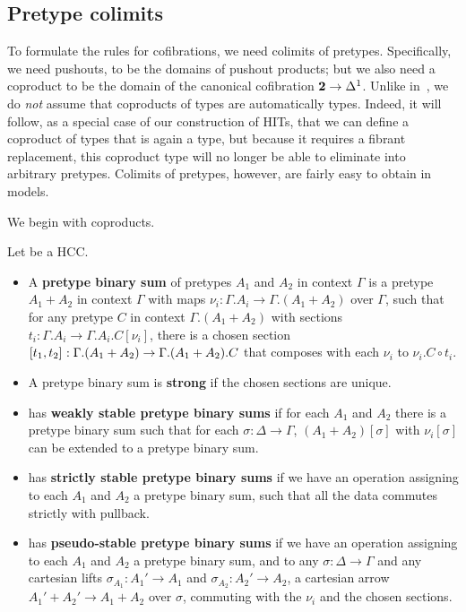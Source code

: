 \documentclass{amsart}
\begin{document}
\subsection{Pretype colimits}
\label{sec:pretype-colimits}

To formulate the rules for cofibrations, we need colimits of pretypes.
Specifically, we need pushouts, to be the domains of pushout products; but we also need a coproduct to be the domain of the canonical cofibration $\mathbf{2}\to {\Delta^1}$.
Unlike in~\cite{vv:hts}, we do \emph{not} assume that coproducts of types are automatically types.
Indeed, it will follow, as a special case of our construction of HITs, that we can define a coproduct of types that is again a type, but because it requires a fibrant replacement, this coproduct type will no longer be able to eliminate into arbitrary pretypes.
Colimits of pretypes, however, are fairly easy to obtain in models.

We begin with coproducts.

\begin{defn}
  Let \E be a HCC.
  \begin{itemize}
  \item A \textbf{pretype binary sum} of pretypes $A_1$ and $A_2$ in context $\Gamma$ is a pretype $A_1+A_2$ in context $\Gamma$ with maps $\nu_i : \Gamma.A_i \to \Gamma.(A_1+A_2)$ over $\Gamma$, such that for any pretype $C$ in context $\Gamma.(A_1+A_2)$ with sections $t_i :\Gamma.A_i \to \Gamma.A_i.C[\nu_i]$, there is a chosen section $\left[ t_1,t_2\right]_{} : \Gamma.(A_1+A_2) \to \Gamma.(A_1+A_2).C$ that composes with each $\nu_i$ to $\nu_i.C \circ t_i$.
  \item A pretype binary sum is \textbf{strong} if the chosen sections are unique.
  \item \E has \textbf{weakly stable pretype binary sums} if for each $A_1$ and $A_2$ there is a pretype binary sum such that for each $\sigma:\Delta\to\Gamma$, $(A_1+A_2)[\sigma]$ with $\nu_i[\sigma]$ can be extended to a pretype binary sum.
  \item \E has \textbf{strictly stable pretype binary sums} if we have an operation assigning to each $A_1$ and $A_2$ a pretype binary sum, such that all the data commutes strictly with pullback.
  \item \E has \textbf{pseudo-stable pretype binary sums} if we have an operation assigning to each $A_1$ and $A_2$ a pretype binary sum, and to any $\sigma:\Delta\to \Gamma$ and any cartesian lifts $\sigma_{A_1}:A_1'\to A_1$ and $\sigma_{A_2}:A_2'\to A_2$, a cartesian arrow $A_1' + A_2' \to A_1+A_2$ over $\sigma$, commuting with the $\nu_i$ and the chosen sections.
  \end{itemize}
\end{defn}
\end{document}
